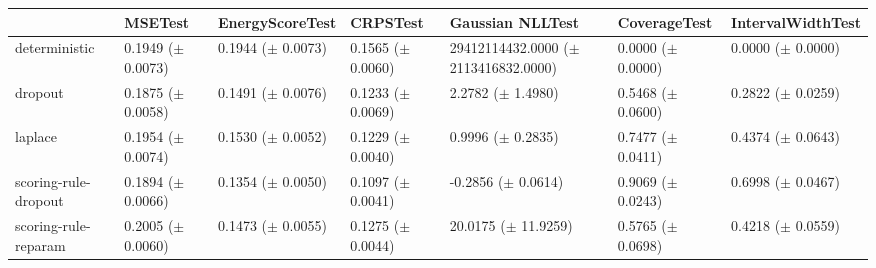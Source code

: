 \begin{tabular}{lllllll}
\toprule
 & MSETest & EnergyScoreTest & CRPSTest & Gaussian NLLTest & CoverageTest & IntervalWidthTest \\
\midrule
deterministic & \makecell{0.1949 \\ ($\pm$ 0.0073)} & \makecell{0.1944 \\ ($\pm$ 0.0073)} & \makecell{0.1565 \\ ($\pm$ 0.0060)} & \makecell{29412114432.0000 \\ ($\pm$ 2113416832.0000)} & \makecell{0.0000 \\ ($\pm$ 0.0000)} & \makecell{0.0000 \\ ($\pm$ 0.0000)} \\
dropout & \makecell{0.1875 \\ ($\pm$ 0.0058)} & \makecell{0.1491 \\ ($\pm$ 0.0076)} & \makecell{0.1233 \\ ($\pm$ 0.0069)} & \makecell{2.2782 \\ ($\pm$ 1.4980)} & \makecell{0.5468 \\ ($\pm$ 0.0600)} & \makecell{0.2822 \\ ($\pm$ 0.0259)} \\
laplace & \makecell{0.1954 \\ ($\pm$ 0.0074)} & \makecell{0.1530 \\ ($\pm$ 0.0052)} & \makecell{0.1229 \\ ($\pm$ 0.0040)} & \makecell{0.9996 \\ ($\pm$ 0.2835)} & \makecell{0.7477 \\ ($\pm$ 0.0411)} & \makecell{0.4374 \\ ($\pm$ 0.0643)} \\
scoring-rule-dropout & \makecell{0.1894 \\ ($\pm$ 0.0066)} & \makecell{0.1354 \\ ($\pm$ 0.0050)} & \makecell{0.1097 \\ ($\pm$ 0.0041)} & \makecell{-0.2856 \\ ($\pm$ 0.0614)} & \makecell{0.9069 \\ ($\pm$ 0.0243)} & \makecell{0.6998 \\ ($\pm$ 0.0467)} \\
scoring-rule-reparam & \makecell{0.2005 \\ ($\pm$ 0.0060)} & \makecell{0.1473 \\ ($\pm$ 0.0055)} & \makecell{0.1275 \\ ($\pm$ 0.0044)} & \makecell{20.0175 \\ ($\pm$ 11.9259)} & \makecell{0.5765 \\ ($\pm$ 0.0698)} & \makecell{0.4218 \\ ($\pm$ 0.0559)} \\
\bottomrule
\end{tabular}
